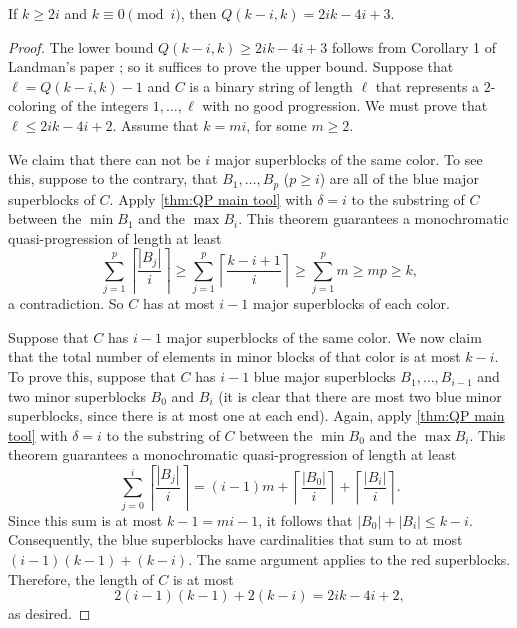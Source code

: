 \begin{theorem} If $k \geq 2i$ and $k \equiv 0 \pmod{i}$, then $Q(k-i,k) = 2ik-4i+3$.
\end{theorem}
\begin{proof} 
The lower bound $Q(k-i,k) \geq 2ik-4i+3$ follows from Corollary 1 of Landman's paper \cite{L}; so it suffices to prove the upper bound. Suppose that $\ell = Q(k-i,k) - 1$ and $C$ is a binary string of length $\ell$ that represents a $2$-coloring of the integers $1,\ldots,\ell$ with no good progression. We must prove that $\ell \leq 2ik-4i+2$. Assume that $k = m i$, for some $m \geq 2$.

We claim that there can not be $i$ major superblocks of the same color. To see this, suppose to the contrary, that $B_1,\ldots,B_p$ ($p \geq i$) are all of the blue major superblocks of $C$. Apply \autoref{thm:QP main tool} with $\delta = i$ to the substring of $C$ between the $\min B_1$ and the $\max B_i$. This theorem guarantees a monochromatic quasi-progression of length at least \[\sum_{j=1}^p \left\lceil \frac{|B_j|}{i} \right\rceil \geq \sum_{j=1}^p \left\lceil \frac{k-i+1}{i} \right\rceil \geq \sum_{j=1}^p m \geq mp \geq k,\] a contradiction. So $C$ has at most $i-1$ major superblocks of each color.

Suppose that $C$ has $i-1$ major superblocks of the same color. We now claim that the total number of elements in minor blocks of that color is at most $k-i$. To prove this, suppose that $C$ has $i-1$ blue major superblocks $B_1,\ldots,B_{i-1}$ and two minor superblocks $B_0$ and $B_{i}$ (it is clear that there are most two blue minor superblocks, since there is at most one at each end). Again, apply \autoref{thm:QP main tool} with $\delta = i$ to the substring of $C$ between the $\min B_0$ and the $\max B_i$. This theorem guarantees a monochromatic quasi-progression of length at least \[\sum_{j=0}^i \left\lceil \frac{|B_j|}{i} \right\rceil = (i-1)m + \left\lceil \frac{|B_0|}{i} \right\rceil + \left\lceil \frac{|B_i|}{i} \right\rceil.\] Since this sum is at most $k-1 = mi-1$, it follows that $|B_0| + |B_i| \leq k - i$. Consequently, the blue superblocks have cardinalities that sum to at most $(i-1)(k-1) + (k-i)$. The same argument applies to the red superblocks. Therefore, the length of $C$ is at most \[2(i-1)(k-1) + 2(k-i) = 2ik-4i+2,\] as desired.
\end{proof}

